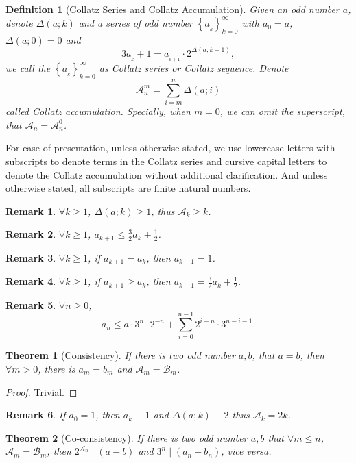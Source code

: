 \documentclass[a4paper,12pt]{article}
\theoremstyle{sltheorem}
\newtheorem{definition}{Definition}
\newtheorem{theorem}{Theorem}
\newtheorem*{remark}{Remark}
\newcommand{\CollatzReduce}[2]{\Delta({#1};{#2})}
\begin{document}
\begin{definition}[Collatz Series and Collatz Accumulation]
	Given an odd number $a$, denote $\CollatzReduce{a}{k}$ and a series of odd number $\left\{a_{_k}\right\}_{k = 0}^{\infty}$ with $a_0 = a$, $\CollatzReduce{a}{0} = 0$ and
	\[ 3a_{_k} + 1 = a_{_{k + 1}} \cdot 2^{\CollatzReduce{a}{k + 1}}, \]
	we call the $\left\{a_{_k}\right\}_{k = 0}^{\infty}$ as Collatz series or Collatz sequence. Denote 
	\[\mathcal{A}_n^{m} = \sum_{i=m}^{n}\CollatzReduce{a}{i}\]
	called Collatz accumulation. Specially, when $m = 0$, we can omit the superscript, that $\mathcal{A}_n = \mathcal{A}_n^{0}$.
\end{definition}
For ease of presentation, unless otherwise stated, we use lowercase letters with subscripts to denote terms in the Collatz series and cursive capital letters to denote the Collatz accumulation without additional clarification. And unless otherwise stated, all subscripts are finite natural numbers.
\begin{remark} $\forall k \ge 1$, $\CollatzReduce{a}{k} \ge 1$, thus $\mathcal{A}_k \ge k$. \end{remark}
\begin{remark} $\forall k \ge 1$, $a_{k + 1} \le \frac{3}{2}a_{k} + \frac{1}{2}$. \end{remark}
\begin{remark} $\forall k \ge 1$, if $a_{k + 1} = a_{k}$, then $a_{k+1} = 1$. \end{remark}
\begin{remark} $\forall k \ge 1$, if $a_{k + 1} \ge a_{k}$, then $a_{k+1} = \frac{3}{2}a_{k} + \frac{1}{2}$. \end{remark}
\begin{remark} $\forall n \ge 0$,
\[a_{n} \le a \cdot 3^{n} \cdot 2^{-n} + \sum_{i=0}^{n-1}2^{i-n} \cdot 3^{n-i-1}. \]
\end{remark}
\begin{theorem}[Consistency]\label{theorem:consistency}
If there is two odd number $a, b$, that $a = b$, then $\forall m > 0$, 
there is $a_m = b_m$ and $\mathcal{A}_m = \mathcal{B}_m$.
\end{theorem}
\begin{proof} Trivial. \end{proof}
\begin{remark} If $a_0 = 1$, then $a_k \equiv 1$ and $\CollatzReduce{a}{k} \equiv 2$ thus $\mathcal{A}_k = 2k$. \end{remark}
\begin{theorem}[Co-consistency]\label{theorem:co-consistency}
    If there is two odd number $a, b$ that $\forall  m \le n$, $\mathcal{A}_m = \mathcal{B}_m$, then $2^{\mathcal{A}_n} \mid (a - b)$ and $3^{n} \mid (a_n - b_n)$, vice versa.
\end{theorem}
\end{document}
